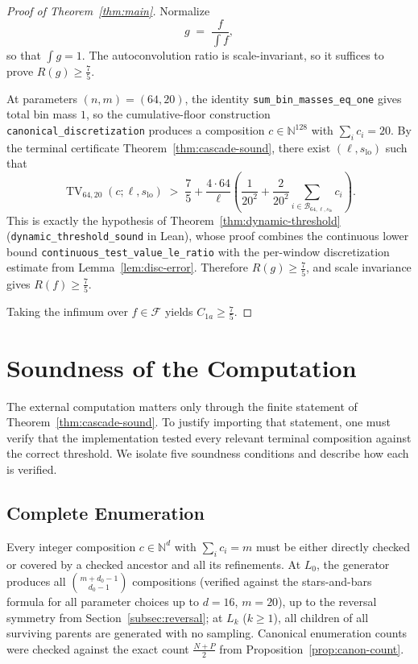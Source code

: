\documentclass[11pt, letterpaper]{article}
\theoremstyle{paperplain}
\theoremstyle{paperdef}
\newcommand{\N}{\mathbb{N}}
\begin{document}
\begin{proof}[Proof of Theorem~\ref{thm:main}]
Normalize
\[
  g \;=\; \frac{f}{\int f},
\]
so that $\int g = 1$.  The autoconvolution ratio is scale-invariant,
so it suffices to prove $R(g)\ge \tfrac75$.

At parameters $(n,m)=(64,20)$, the identity
\texttt{sum\_bin\_masses\_eq\_one} gives total bin mass $1$, so the
cumulative-floor construction
\texttt{canonical\_discretization} produces a composition
$c\in\N^{128}$ with $\sum_i c_i=20$.  By the terminal certificate
Theorem~\ref{thm:cascade-sound}, there exist
$(\ell,s_{\mathrm{lo}})$ such that
\[
  \operatorname{TV}_{64,20}(c;\ell,s_{\mathrm{lo}})
  \;>\;
  \frac75
  +
  \frac{4\cdot 64}{\ell}
  \left(
    \frac{1}{20^2}
    +
    \frac{2}{20^2}
    \sum_{i\in\mathcal{B}_{64,\ell,s_{\mathrm{lo}}}} c_i
  \right).
\]
This is exactly the hypothesis of
Theorem~\ref{thm:dynamic-threshold}
(\texttt{dynamic\_threshold\_sound} in Lean), whose proof combines
the continuous lower bound
\texttt{continuous\_test\_value\_le\_ratio}
with the per-window discretization estimate from
Lemma~\ref{lem:disc-error}.  Therefore $R(g)\ge \tfrac75$, and
scale invariance gives $R(f)\ge \tfrac75$.

Taking the infimum over $f\in\mathcal{F}$ yields
$C_{1a}\ge \tfrac75$.
\end{proof}


\section{Soundness of the Computation}\label{sec:correctness}

The external computation matters only through the finite statement of
Theorem~\ref{thm:cascade-sound}.  To justify importing that statement,
one must verify that the implementation tested every relevant terminal
composition against the correct threshold.  We isolate five soundness
conditions and describe how each is verified.

\subsection{Complete Enumeration}

Every integer composition
$c \in \N^d$ with $\sum_i c_i = m$ must be either directly checked or
covered by a checked ancestor and all its refinements.
At $L_0$, the generator produces all $\binom{m + d_0 - 1}{d_0 - 1}$
compositions (verified against the stars-and-bars formula for all
parameter choices up to $d=16$, $m=20$), up to the reversal symmetry
from Section~\ref{subsec:reversal}; at $L_k$ ($k \ge 1$), all children
of all surviving parents are generated with no sampling.  Canonical
enumeration counts were checked against the exact count
$\tfrac{N+P}{2}$ from Proposition~\ref{prop:canon-count}.
\end{document}
